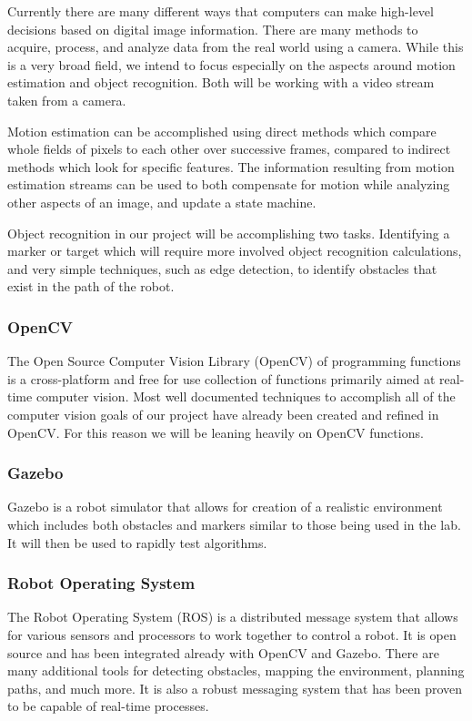 \documentclass{article}
\begin{document}
		Currently there are many different ways that computers can make high-level decisions based on digital image information. There are many methods to acquire, process, and analyze data from the real world using a camera. While this is a very broad field, we intend to focus especially on the aspects around motion estimation and object recognition. Both will be working with a video stream taken from a camera. 
		
		Motion estimation can be accomplished using direct methods which compare whole fields of pixels to each other over successive frames, compared to indirect methods which look for specific features. The information resulting from motion estimation streams can be used to both compensate for motion while analyzing other aspects of an image, and update a state machine.
		
		Object recognition in our project will be accomplishing two tasks. Identifying a marker or target which will require more involved object recognition calculations, and very simple techniques, such as edge detection, to identify obstacles that exist in the path of the robot.
		
		\subsubsection{OpenCV}
		
		The Open Source Computer Vision Library (OpenCV) of programming functions is a cross-platform and free for use collection of functions primarily aimed at real-time computer vision\cite{opencv}. Most well documented techniques to accomplish all of the computer vision goals of our project have already been created and refined in OpenCV. For this reason we will be leaning heavily on OpenCV functions.
		
		\subsubsection{Gazebo}
		
		Gazebo is a robot simulator that allows for creation of a realistic environment which includes both obstacles and markers similar to those being used in the lab. It will then be used to rapidly test algorithms.
		
		\subsubsection{Robot Operating System}
		
		The Robot Operating System (ROS) is a distributed message system that allows for various sensors and processors to work together to control a robot. It is open source and has been integrated already with OpenCV and Gazebo. There are many additional tools for detecting obstacles, mapping the environment, planning paths, and much more. It is also a robust messaging system that has been proven to be capable of real-time processes.
		
\end{document}
